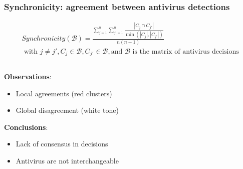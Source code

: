 \begin{frame}
    \frametitle{Synchronicity: agreement between antivirus detections}
    \vspace{-10pt}

    \footnotesize{
        \begin{gather*}
            Synchronicity(\mathcal{B}) = \frac{\sum^n_{j=1} \sum^{n}_{j'=1}
            \dfrac{|C_j \cap C_{j'}|}{\min(|C_j|,|C_{j'}|)}}{n (n-1)} \\
            \text{ with } j \neq j', C_j \in \mathcal{B}, C_{j'} \in \mathcal{B},
            \text{and } \mathcal{B} \text{ is the matrix of antivirus decisions}
        \end{gather*}
    }

    \vspace{-20pt}

    \begin{columns}
        \begin{column}{0.55\textwidth}
            \vspace{-15pt}
            \centering
            \small{}

            \bigskip{}
            \textbf{Observations}:\\
            \smallskip{}
            \begin{itemize}
                \item Local agreements (red clusters)
                \item Global disagreement (white tone)
            \end{itemize}

            \bigskip{}
            \textbf{Conclusions}:\\
            \smallskip{}
            \begin{itemize}
                \item Lack of consensus in decisions
                \item Antivirus are not interchangeable
            \end{itemize}

        \end{column}


\end{columns}
\end{frame}
